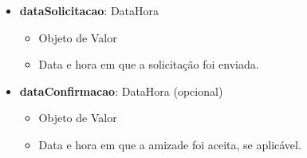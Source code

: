 \begin{itemize}
        \item \textbf{dataSolicitacao}: DataHora  
              \begin{itemize}
                  \item Objeto de Valor
                  \item Data e hora em que a solicitação foi enviada.
              \end{itemize}
    
        \item \textbf{dataConfirmacao}: DataHora (opcional)  
              \begin{itemize}
                  \item Objeto de Valor
                  \item Data e hora em que a amizade foi aceita, se aplicável.
              \end{itemize}
    \end{itemize}

